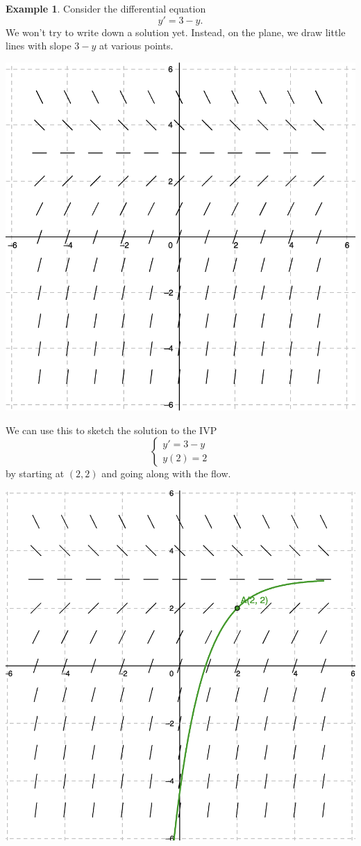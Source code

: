 \documentclass[12pt]{amsart}
\numberwithin{equation}{section}
\theoremstyle{plain} %
\theoremstyle{definition}
\newtheorem{ex}[equation]{Example}
\theoremstyle{remark}
\begin{document}
\begin{ex}\label{ex:first aut} Consider the differential equation 
\[ y' = 3-y.\]
We won't try to write down a solution yet. Instead, on the plane, we draw little lines with slope $3-y$ at various points.\\
\begin{center}\includegraphics[scale=.5]{sf1}\end{center}
We can use this to sketch the solution to the IVP
\[\begin{cases} y' = 3-y \\
y(2)= 2 \end{cases}\]
by starting at $(2,2)$ and going along with the flow.
\begin{center}\includegraphics[scale=.5]{sf2}\end{center}


\end{ex}
\end{document}

